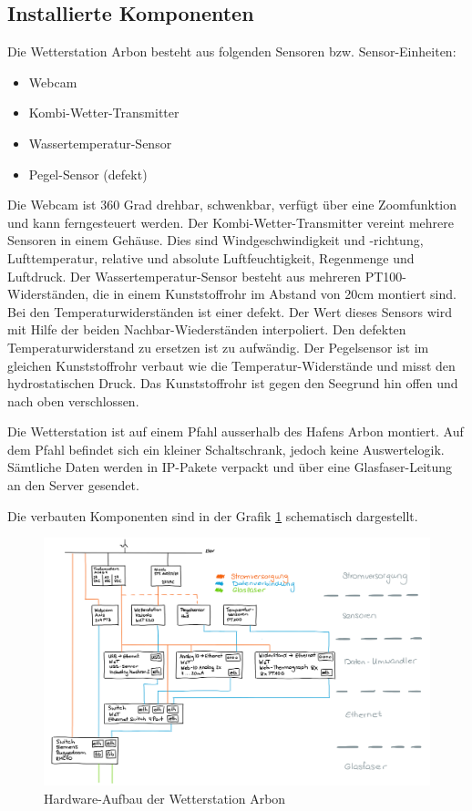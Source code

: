 \documentclass[a4paper,ngerman, 11pt]{report}
\begin{document}
\subsection{Installierte Komponenten}

Die Wetterstation Arbon besteht aus folgenden Sensoren bzw. Sensor-Einheiten:
\begin{itemize}  
\item Webcam
\item Kombi-Wetter-Transmitter
\item Wassertemperatur-Sensor
\item Pegel-Sensor (defekt)
\end{itemize}


Die Webcam ist 360 Grad drehbar, schwenkbar, verfügt über eine Zoomfunktion und kann ferngesteuert werden.  Der Kombi-Wetter-Transmitter vereint mehrere Sensoren in einem Gehäuse. Dies sind Windgeschwindigkeit und -richtung, Lufttemperatur, relative und absolute Luftfeuchtigkeit, Regenmenge und Luftdruck. Der Wassertemperatur-Sensor besteht aus mehreren PT100-Widerständen, die in einem Kunststoffrohr im Abstand von 20cm montiert sind. Bei den Temperaturwiderständen ist einer defekt. Der Wert dieses Sensors wird mit Hilfe der beiden Nachbar-Wiederständen interpoliert. Den defekten Temperaturwiderstand zu ersetzen ist zu aufwändig. Der Pegelsensor ist im gleichen Kunststoffrohr verbaut wie die Temperatur-Widerstände und misst den hydrostatischen Druck. Das Kunststoffrohr ist gegen den Seegrund hin offen und nach oben verschlossen.

Die Wetterstation ist auf einem Pfahl ausserhalb des Hafens Arbon montiert. Auf dem Pfahl befindet sich ein kleiner Schaltschrank, jedoch keine Auswertelogik. Sämtliche Daten werden in IP-Pakete verpackt und über eine Glasfaser-Leitung an den Server gesendet.

Die verbauten Komponenten sind in der Grafik \ref{img:HW-Aufbau} schematisch dargestellt.

\begin{figure}[htbp]
	\centering
	\includegraphics[width=1\linewidth]{img/HW-Aufbau}
	\caption{Hardware-Aufbau der Wetterstation Arbon}
	\label{img:HW-Aufbau}
\end{figure}
\end{document}
